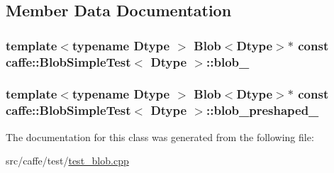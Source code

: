 \subsection{Member Data Documentation}
\hypertarget{classcaffe_1_1_blob_simple_test_a3e468873646ed610428bf0736e848fdd}{
\subsubsection[{blob\+\_\+}]{\setlength{\rightskip}{0pt plus 5cm}template$<$typename Dtype $>$ {\bf Blob}$<$Dtype$>$$\ast$ const {\bf caffe\+::\+Blob\+Simple\+Test}$<$ Dtype $>$\+::blob\+\_\+\hspace{0.3cm}{\ttfamily [protected]}}}\label{classcaffe_1_1_blob_simple_test_a3e468873646ed610428bf0736e848fdd}
\hypertarget{classcaffe_1_1_blob_simple_test_a3614f695be135a4414285ce66bc67a20}{
\subsubsection[{blob\+\_\+preshaped\+\_\+}]{\setlength{\rightskip}{0pt plus 5cm}template$<$typename Dtype $>$ {\bf Blob}$<$Dtype$>$$\ast$ const {\bf caffe\+::\+Blob\+Simple\+Test}$<$ Dtype $>$\+::blob\+\_\+preshaped\+\_\+\hspace{0.3cm}{\ttfamily [protected]}}}\label{classcaffe_1_1_blob_simple_test_a3614f695be135a4414285ce66bc67a20}


The documentation for this class was generated from the following file\+:\begin{DoxyCompactItemize}
\item 
src/caffe/test/\hyperlink{test__blob_8cpp}{test\+\_\+blob.\+cpp}\end{DoxyCompactItemize}
